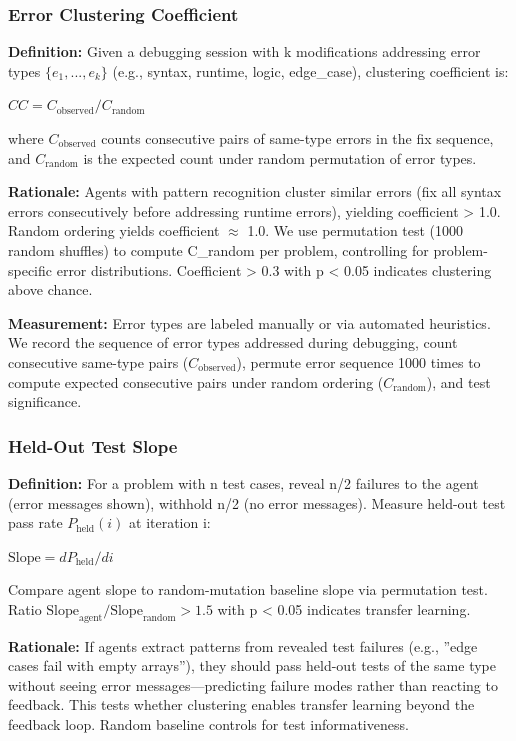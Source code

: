 \subsubsection{Error Clustering Coefficient}

\textbf{Definition:} Given a debugging session with k modifications addressing error types $\{e_1, ..., e_k\}$ (e.g., syntax, runtime, logic, edge\_case), clustering coefficient is:

$CC = C_{\text{observed}} / C_{\text{random}}$

where $C_{\text{observed}}$ counts consecutive pairs of same-type errors in the fix sequence, and $C_{\text{random}}$ is the expected count under random permutation of error types.

\textbf{Rationale:} Agents with pattern recognition cluster similar errors (fix all syntax errors consecutively before addressing runtime errors), yielding coefficient > 1.0. Random ordering yields coefficient $\approx$ 1.0. We use permutation test (1000 random shuffles) to compute C\_random per problem, controlling for problem-specific error distributions. Coefficient > 0.3 with p < 0.05 indicates clustering above chance.

\textbf{Measurement:} Error types are labeled manually or via automated heuristics. We record the sequence of error types addressed during debugging, count consecutive same-type pairs ($C_{\text{observed}}$), permute error sequence 1000 times to compute expected consecutive pairs under random ordering ($C_{\text{random}}$), and test significance.

\subsubsection{Held-Out Test Slope}

\textbf{Definition:} For a problem with n test cases, reveal n/2 failures to the agent (error messages shown), withhold n/2 (no error messages). Measure held-out test pass rate $P_{\text{held}}(i)$ at iteration i:

$\text{Slope} = dP_{\text{held}} / di$

Compare agent slope to random-mutation baseline slope via permutation test. Ratio $\text{Slope}_{\text{agent}} / \text{Slope}_{\text{random}} > 1.5$ with p < 0.05 indicates transfer learning.

\textbf{Rationale:} If agents extract patterns from revealed test failures (e.g., ''edge cases fail with empty arrays''), they should pass held-out tests of the same type without seeing error messages---predicting failure modes rather than reacting to feedback. This tests whether clustering enables transfer learning beyond the feedback loop. Random baseline controls for test informativeness.

